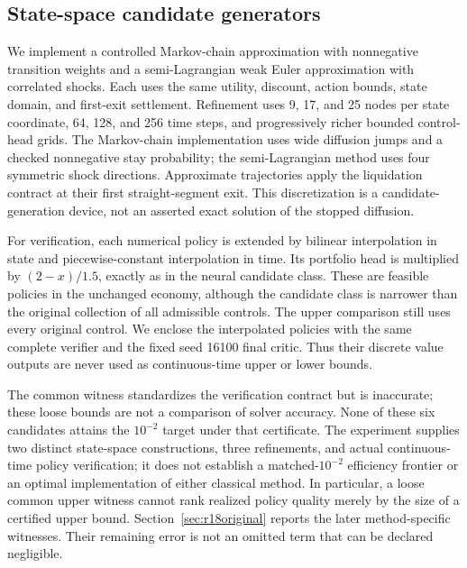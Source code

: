 \subsection{State-space candidate generators}
We implement a controlled Markov-chain approximation with nonnegative transition weights and a semi-Lagrangian weak Euler approximation with correlated shocks. Each uses the same utility, discount, action bounds, state domain, and first-exit settlement. Refinement uses 9, 17, and 25 nodes per state coordinate, 64, 128, and 256 time steps, and progressively richer bounded control-head grids. The Markov-chain implementation uses wide diffusion jumps and a checked nonnegative stay probability; the semi-Lagrangian method uses four symmetric shock directions. Approximate trajectories apply the liquidation contract at their first straight-segment exit. This discretization is a candidate-generation device, not an asserted exact solution of the stopped diffusion.

For verification, each numerical policy is extended by bilinear interpolation in state and piecewise-constant interpolation in time. Its portfolio head is multiplied by $(2-x)/1.5$, exactly as in the neural candidate class. These are feasible policies in the unchanged economy, although the candidate class is narrower than the original collection of all admissible controls. The upper comparison still uses every original control. We enclose the interpolated policies with the same complete verifier and the fixed seed 16100 final critic. Thus their discrete value outputs are never used as continuous-time upper or lower bounds.


The common witness standardizes the verification contract but is inaccurate; these loose bounds are not a comparison of solver accuracy. None of these six candidates attains the $10^{-2}$ target under that certificate. The experiment supplies two distinct state-space constructions, three refinements, and actual continuous-time policy verification; it does not establish a matched-$10^{-2}$ efficiency frontier or an optimal implementation of either classical method. In particular, a loose common upper witness cannot rank realized policy quality merely by the size of a certified upper bound. Section~\ref{sec:r18original} reports the later method-specific witnesses. Their remaining error is not an omitted term that can be declared negligible.

